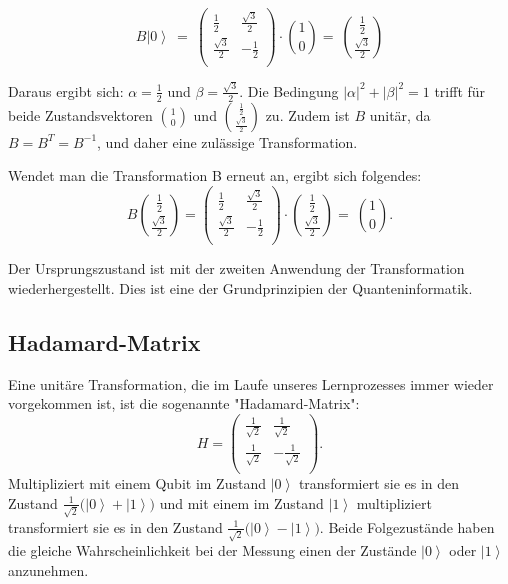 $$B\left|\left.0\right\rangle\ =\ \right.\left(\begin{matrix}\frac{1}{2}&\frac{\sqrt3}{2}\\\frac{\sqrt3}{2}&-\frac{1}{2}\\\end{matrix}\right)\cdot\binom{1}{0}=\ \binom{\frac{1}{2}}{\frac{\sqrt3}{2}}$$

Daraus ergibt sich: $\alpha=\frac{1}{2}$ und $\beta=\frac{\sqrt3}{2}$. Die Bedingung $\left|\alpha\right|^2+\left|\beta\right|^2=1$ trifft für beide Zustandsvektoren $\binom{1}{0}$ und $\binom{\frac{1}{2}}{\frac{\sqrt3}{2}}$ zu. Zudem ist $B$ unitär, da $B=B^T= B^{-1}$, und daher eine zulässige Transformation.

Wendet man die Transformation B erneut an, ergibt sich folgendes:
$$B\binom{\frac{1}{2}}{\frac{\sqrt3}{2}}=\left(\begin{matrix}\frac{1}{2}&\frac{\sqrt3}{2}\\\frac{\sqrt3}{2}&-\frac{1}{2}\\\end{matrix}\right)\cdot\binom{\frac{1}{2}}{\frac{\sqrt3}{2}}=\ \binom{1}{0}.$$

Der Ursprungszustand ist mit der zweiten Anwendung der Transformation wiederhergestellt. Dies ist eine der Grundprinzipien der Quanteninformatik.

\subsection{Hadamard-Matrix}

Eine unitäre Transformation, die im Laufe unseres Lernprozesses immer wieder vorgekommen ist, ist die sogenannte "Hadamard-Matrix": $$H=\left(\begin{matrix}\frac{1}{\sqrt2}&\frac{1}{\sqrt2}\\\frac{1}{\sqrt2}&-\frac{1}{\sqrt2}\\\end{matrix}\right).$$ Multipliziert mit einem Qubit im Zustand $\left|0\right\rangle$ transformiert sie es in den Zustand $\frac{1}{\sqrt2}(\left|\left.0\right\rangle+\right.\left|\left.1\right\rangle)\right.$ und mit einem im Zustand $\left|1\right\rangle$ multipliziert transformiert sie es in den Zustand $\frac{1}{\sqrt2}(\left|\left.0\right\rangle-\right.\left|\left.1\right\rangle)\right.$. Beide Folgezustände haben die gleiche Wahrscheinlichkeit bei der Messung einen der Zustände $\left|0\right\rangle$ oder $\left|1\right\rangle$ anzunehmen. \\


